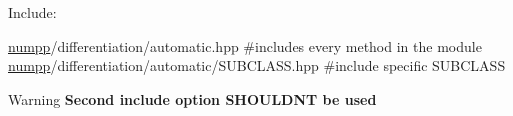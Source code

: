 Include\+: 
\begin{DoxyCode}
\hyperlink{namespacenumpp}{numpp}/differentiation/automatic.hpp #includes every method in the module
\hyperlink{namespacenumpp}{numpp}/differentiation/automatic/SUBCLASS.hpp #include specific SUBCLASS
\end{DoxyCode}


\begin{DoxyWarning}{Warning}
{\bfseries Second include option S\+H\+O\+U\+L\+DN\textquotesingle{}T be used} 
\end{DoxyWarning}
